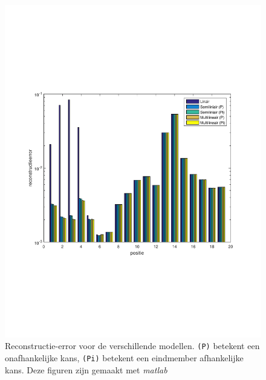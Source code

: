 \documentclass[12pt]{report}
\begin{document}
\begin{figure}
\includegraphics[width=0.79\linewidth,trim=0 200 0 175 cm]{exp_errors.pdf}
\caption{Reconstructie-error voor de verschillende modellen. \texttt{(P)} betekent een onafhankelijke kans, \texttt{(Pi)} betekent een eindmember afhankelijke kans. Deze figuren zijn gemaakt met \textit{matlab}\cite{MATLAB} \label{fig:errorsR}}
\end{figure}
\end{document}
